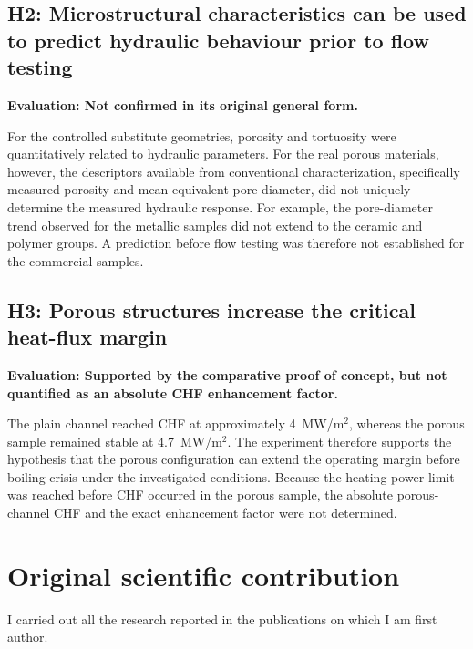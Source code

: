 \documentclass[a4paper]{article}
\begin{document}
\subsection{H2: Microstructural characteristics can be used to predict hydraulic behaviour prior to flow testing}
\textbf{Evaluation: Not confirmed in its original general form.}

For the controlled substitute geometries, porosity and tortuosity were quantitatively related to hydraulic parameters. For the real porous materials, however, the descriptors available from conventional characterization, specifically measured porosity and mean equivalent pore diameter, did not uniquely determine the measured hydraulic response. For example, the pore-diameter trend observed for the metallic samples did not extend to the ceramic and polymer groups. A prediction before flow testing was therefore not established for the commercial samples.

\subsection{H3: Porous structures increase the critical heat-flux margin}
\textbf{Evaluation: Supported by the comparative proof of concept, but not quantified as an absolute CHF enhancement factor.}

The plain channel reached CHF at approximately 4~MW/m$^2$, whereas the porous sample remained stable at 4.7~MW/m$^2$. The experiment therefore supports the hypothesis that the porous configuration can extend the operating margin before boiling crisis under the investigated conditions. Because the heating-power limit was reached before CHF occurred in the porous sample, the absolute porous-channel CHF and the exact enhancement factor were not determined.

\section{Original scientific contribution}
I carried out all the research reported in the publications on which I am first author.
\end{document}
